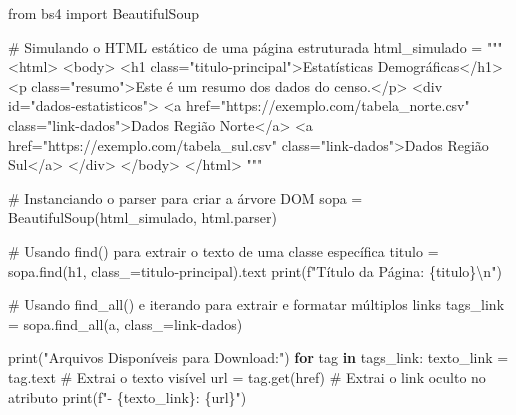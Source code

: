 \documentclass[
  brazilian,
  letterpaper,
  DIV=11,
  numbers=noendperiod]{scrreprt}
\newenvironment{Shaded}{\begin{snugshade}}{\end{snugshade}}
\newcommand{\BuiltInTok}[1]{\textcolor[rgb]{0.00,0.23,0.31}{#1}}
\newcommand{\CharTok}[1]{\textcolor[rgb]{0.13,0.47,0.30}{#1}}
\newcommand{\CommentTok}[1]{\textcolor[rgb]{0.37,0.37,0.37}{#1}}
\newcommand{\ControlFlowTok}[1]{\textcolor[rgb]{0.00,0.23,0.31}{\textbf{#1}}}
\newcommand{\ImportTok}[1]{\textcolor[rgb]{0.00,0.46,0.62}{#1}}
\newcommand{\KeywordTok}[1]{\textcolor[rgb]{0.00,0.23,0.31}{\textbf{#1}}}
\newcommand{\NormalTok}[1]{\textcolor[rgb]{0.00,0.23,0.31}{#1}}
\newcommand{\OperatorTok}[1]{\textcolor[rgb]{0.37,0.37,0.37}{#1}}
\newcommand{\SpecialCharTok}[1]{\textcolor[rgb]{0.37,0.37,0.37}{#1}}
\newcommand{\SpecialStringTok}[1]{\textcolor[rgb]{0.13,0.47,0.30}{#1}}
\newcommand{\StringTok}[1]{\textcolor[rgb]{0.13,0.47,0.30}{#1}}
\begin{document}
\begin{Shaded}
\begin{Highlighting}[]
\ImportTok{from}\NormalTok{ bs4 }\ImportTok{import}\NormalTok{ BeautifulSoup}

\CommentTok{\# Simulando o HTML estático de uma página estruturada}
\NormalTok{html\_simulado }\OperatorTok{=} \StringTok{"""}
\StringTok{\textless{}html\textgreater{}}
\StringTok{  \textless{}body\textgreater{}}
\StringTok{    \textless{}h1 class="titulo{-}principal"\textgreater{}Estatísticas Demográficas\textless{}/h1\textgreater{}}
\StringTok{    \textless{}p class="resumo"\textgreater{}Este é um resumo dos dados do censo.\textless{}/p\textgreater{}}
\StringTok{    \textless{}div id="dados{-}estatisticos"\textgreater{}}
\StringTok{      \textless{}a href="https://exemplo.com/tabela\_norte.csv" }
\StringTok{      class="link{-}dados"\textgreater{}Dados Região Norte\textless{}/a\textgreater{}}
\StringTok{      \textless{}a href="https://exemplo.com/tabela\_sul.csv" }
\StringTok{      class="link{-}dados"\textgreater{}Dados Região Sul\textless{}/a\textgreater{}}
\StringTok{    \textless{}/div\textgreater{}}
\StringTok{  \textless{}/body\textgreater{}}
\StringTok{\textless{}/html\textgreater{}}
\StringTok{"""}

\CommentTok{\# Instanciando o parser para criar a árvore DOM}
\NormalTok{sopa }\OperatorTok{=}\NormalTok{ BeautifulSoup(html\_simulado, }\StringTok{\textquotesingle{}html.parser\textquotesingle{}}\NormalTok{)}

\CommentTok{\# Usando find() para extrair o texto de uma classe específica}
\NormalTok{titulo }\OperatorTok{=}\NormalTok{ sopa.find(}\StringTok{\textquotesingle{}h1\textquotesingle{}}\NormalTok{, class\_}\OperatorTok{=}\StringTok{\textquotesingle{}titulo{-}principal\textquotesingle{}}\NormalTok{).text}
\BuiltInTok{print}\NormalTok{(}\SpecialStringTok{f"Título da Página: }\SpecialCharTok{\{}\NormalTok{titulo}\SpecialCharTok{\}}\CharTok{\textbackslash{}n}\SpecialStringTok{"}\NormalTok{)}

\CommentTok{\# Usando find\_all() e iterando para extrair e formatar múltiplos links}
\NormalTok{tags\_link }\OperatorTok{=}\NormalTok{ sopa.find\_all(}\StringTok{\textquotesingle{}a\textquotesingle{}}\NormalTok{, class\_}\OperatorTok{=}\StringTok{\textquotesingle{}link{-}dados\textquotesingle{}}\NormalTok{)}

\BuiltInTok{print}\NormalTok{(}\StringTok{"Arquivos Disponíveis para Download:"}\NormalTok{)}
\ControlFlowTok{for}\NormalTok{ tag }\KeywordTok{in}\NormalTok{ tags\_link:}
\NormalTok{    texto\_link }\OperatorTok{=}\NormalTok{ tag.text          }\CommentTok{\# Extrai o texto visível}
\NormalTok{    url }\OperatorTok{=}\NormalTok{ tag.get(}\StringTok{\textquotesingle{}href\textquotesingle{}}\NormalTok{)          }\CommentTok{\# Extrai o link oculto no atributo}
    \BuiltInTok{print}\NormalTok{(}\SpecialStringTok{f"{-} }\SpecialCharTok{\{}\NormalTok{texto\_link}\SpecialCharTok{\}}\SpecialStringTok{: }\SpecialCharTok{\{}\NormalTok{url}\SpecialCharTok{\}}\SpecialStringTok{"}\NormalTok{)}
\end{Highlighting}
\end{Shaded}
\end{document}
